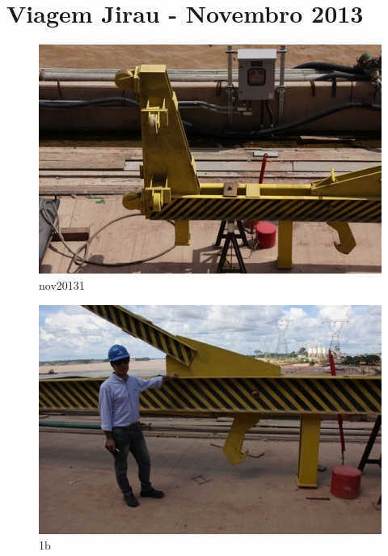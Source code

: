 \section{Viagem Jirau - Novembro 2013}

\begin{figure}[h!]
\centering
  \includegraphics[width=1\linewidth]{Fotos/Novembro2013/1.jpg}
  \caption{nov20131}
  \label{nov20131}
\end{figure}

\begin{figure}[h!]
  \centering
  \includegraphics[width=1\linewidth]{Fotos/Novembro2013/2.jpg}
  \caption{1b}
  \label{nov20132}
\end{figure}

